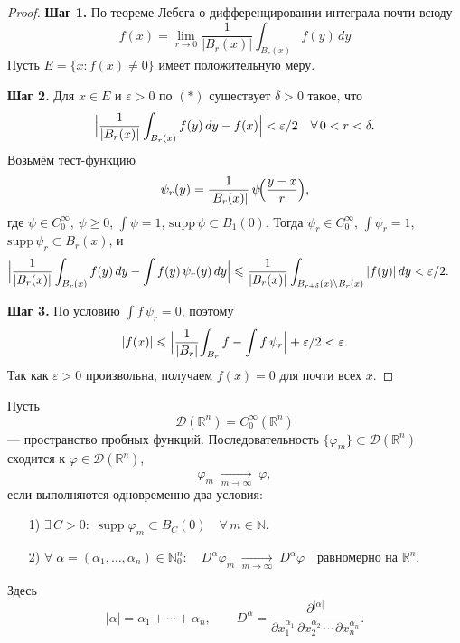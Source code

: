 \begin{proof}
\textbf{Шаг 1.}
По теореме Лебега о дифференцировании интеграла почти всюду
\[
f(x)
=\lim_{r\to0}\frac1{|B_r(x)|}\int_{B_r(x)}f(y)\,dy
\tag{$*$}
\]
Пусть $E=\{x:f(x)\neq0\}$ имеет положительную меру.

\textbf{Шаг 2.}
Для $x\in E$ и $\varepsilon>0$ по $(*)$ существует $\delta>0$ такое, что
\[
\Bigl|\frac1{|B_r(x)|}\int_{B_r(x)}f(y)\,dy - f(x)\Bigr|<\varepsilon/2
\quad
\forall\,0<r<\delta.
\]
Возьмём тест-функцию
\[
\psi_r(y)
=\frac1{|B_r(x)|}\,\psi\!\Bigl(\frac{y-x}{r}\Bigr),
\]
где $\psi\in C_0^\infty$, $\psi\ge0$, $\int\psi=1$, $\mathrm{supp}\,\psi\subset B_1(0)$.
Тогда $\psi_r\in C_0^\infty$, $\int\psi_r=1$, $\mathrm{supp}\,\psi_r\subset B_r(x)$, и
\begin{align*}
\Bigl|\frac1{|B_r(x)|}\int_{B_r(x)}f(y)\,dy - \int f(y)\,\psi_r(y)\,dy\Bigr|
&\le
\frac1{|B_r(x)|}\int_{B_{r+\delta}(x)\setminus B_r(x)}|f(y)|\,dy
<\varepsilon/2.
\end{align*}

\textbf{Шаг 3.}
По условию $\int f\,\psi_r=0$, поэтому
\[
|f(x)| \le \Bigl|\frac1{|B_r|}\!\int_{B_r}f - \int f\,\psi_r\Bigr| + \varepsilon/2
<\varepsilon.
\]
Так как $\varepsilon>0$ произвольна, получаем $f(x)=0$ для почти всех $x$.
\end{proof}

\begin{definition}
Пусть
\[
\mathcal{D}(\mathbb{R}^n)=C_0^\infty(\mathbb{R}^n)
\]
— пространство пробных функций. Последовательность
\(\{\varphi_m\}\subset\mathcal{D}(\mathbb{R}^n)\)
сходится к \(\varphi\in\mathcal{D}(\mathbb{R}^n)\),
\[
\varphi_m\;\xrightarrow[m\to\infty]{}\;\varphi,
\]
если выполняются одновременно два условия:
\begin{enumerate}
  \item[1)] \(\displaystyle\exists\,C>0:\;
    \operatorname{supp}\varphi_m\subset B_C(0)\quad\forall\,m\in\mathbb{N}.\)
  \item[2)] \(\displaystyle\forall\;\alpha=(\alpha_1,\dots,\alpha_n)\in\mathbb{N}_0^n:\quad
    D^\alpha\varphi_m\;\xrightarrow[m\to\infty]{}\;D^\alpha\varphi
    \quad\text{равномерно на }\mathbb{R}^n.\)
\end{enumerate}
Здесь
\[
|\alpha|=\alpha_1+\cdots+\alpha_n,
\qquad
D^\alpha
=\frac{\partial^{|\alpha|}}{\partial x_1^{\alpha_1}\,\partial x_2^{\alpha_2}\,\cdots\,\partial x_n^{\alpha_n}}.
\]
\end{definition}

